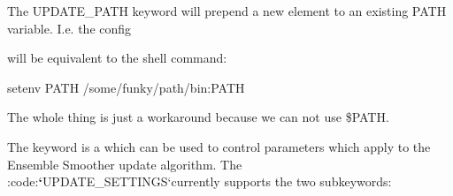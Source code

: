 \documentclass[letterpaper,10pt,english]{sphinxmanual}
\begin{document}
\begin{sphinxShadowBox}

The UPDATE\_PATH keyword will prepend a new element to an existing PATH
variable. I.e. the config

%
\begin{sphinxVerbatim}[commandchars=\\\{\}]
     
\end{sphinxVerbatim}

will be equivalent to the shell command:

%
\begin{sphinxVerbatim}[commandchars=\\\{\}]
setenv PATH /some/funky/path/bin:\PYGZdl{}PATH
\end{sphinxVerbatim}

The whole thing is just a workaround because we can not use \$PATH.
\end{sphinxShadowBox}
\label{\detokenize{keywords/index:update-settings}}
The  keyword is a  which can be used to
control parameters which apply to the Ensemble Smoother update algorithm. The
:code:{\color{red}\bfseries{}{}`}UPDATE\_SETTINGS{}`currently supports the two subkeywords:
\end{document}
